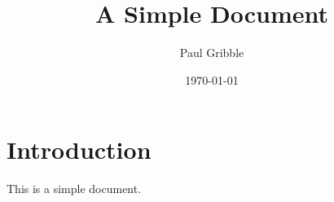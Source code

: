 \documentclass[12pt,letterpaper]{article}
\author{Paul Gribble}
\date{\today}
\title{A Simple Document}
\begin{document}
\maketitle

\section{Introduction}

This is a simple document.
\end{document}

